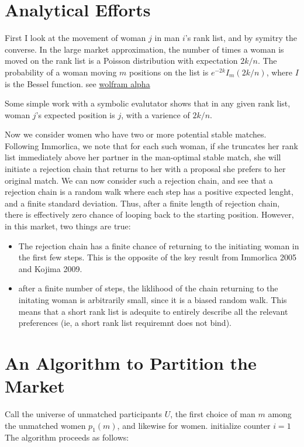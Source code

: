 \documentclass[WP]{AEA}
\begin{document}
\section{Analytical Efforts}

First I look at the movement of woman $j$ in man $i$'s rank list, and by symitry the converse. In the large market approximation, the number of times a woman is moved on the rank list is a Poisson distribution with expectation $2k/n$.  The probability of a woman moving $m$ positions on the list is $e^{-2k}I_m(2k/n)$, where $I$ is the Bessel function.  see \href{https://www.wolframalpha.com/input/?i=e%5E-10*BesselI%286%2C+10%29}{wolfram alpha}
	
Some simple work with a symbolic evalutator shows that in any given rank list, woman $j$'s expected position is $j$, with a varience of $2k/n$.
	
Now we consider women who have two or more potential stable matches.  Following Immorlica, we note that for each such woman, if she truncates her rank list immediately above her partner in the man-optimal stable match, she will initiate a rejection chain that returns to her with a proposal she prefers to her original match.	
We can now consider such a rejection chain, and see that a rejection chain is a random walk where each step has a positive expected lenght, and a finite standard deviation.  Thus, after a finite length of rejection chain, there is effectively zero chance of looping back to the starting position.  However, in this market, two things are true:
\begin{itemize}
	\item The rejection chain has a finite chance of returning to the initiating woman in the first few steps.  This is the opposite of the key result from Immorlica 2005 and Kojima 2009.
	\item after a finite number of steps, the liklihood of the chain returning to the initating woman is arbitrarily small, since it is a biased random walk. This means that a short rank list is adequite to entirely describe all the relevant preferences (ie, a short rank list requiremnt does not bind).
\end{itemize}


\section{An Algorithm to Partition the Market}

Call the universe of unmatched participants $U$, the first choice of man $m$ among the unmatched women $p_1(m)$, and likewise for women. initialize counter $i = 1$  The algorithm proceeds as follows: 
\end{document}
